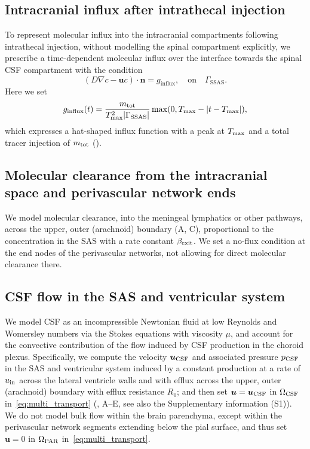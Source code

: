 \documentclass[fleqn,10pt]{wlscirep}
\begin{document}
\subsection*{Intracranial influx after intrathecal injection}
To represent molecular influx into the intracranial compartments
following intrathecal injection, without modelling the spinal
compartment explicitly, we prescribe a time-dependent molecular influx
over the interface towards the spinal CSF compartment with the condition
\begin{equation*}
  (D \nabla c - \bm u c ) \cdot \bm{n} = g_{\mathrm{influx}},  \quad \mathrm{on}  \quad \Gamma_{\mathrm{SSAS}}.
\end{equation*}
Here we set
\begin{equation*}
  g_\mathrm{influx}(t) = \frac{m_{\rm tot}}{T_{\rm max}^2 |\Gamma_{\rm SSAS}|} \max(0, T_{\rm max} - |t - T_{\rm max}|), 
\end{equation*}
which expresses a hat-shaped influx function with a peak at $T_{\rm max}$ and a total tracer injection of $m_{\rm tot}$ ().

\subsection*{Molecular clearance from the intracranial space and perivascular network ends}

We model molecular clearance, into the meningeal lymphatics or other
pathways, across the upper, outer (arachnoid) boundary
(A, C), proportional to the
concentration in the SAS with a rate constant $\beta_{\rm exit}$. We
set a no-flux condition at the end nodes of the perivascular networks,
not allowing for direct molecular clearance there.

\subsection*{CSF flow in the SAS and ventricular system}

We model CSF as an incompressible Newtonian fluid at low Reynolds and
Womersley numbers via the Stokes equations with viscosity $\mu$, and
account for the convective contribution of the flow induced by CSF
production in the choroid plexus. Specifically, we compute the
velocity $\bm u_{\rm CSF}$ and associated pressure $p_{\rm CSF}$ in
the SAS and ventricular system induced by a constant production at a
rate of $u_{\rm in}$ across the lateral ventricle walls and with
efflux across the upper, outer (arachnoid) boundary with efflux
resistance $R_0$; and then set $\bm u = \bm u_{\rm CSF}$ in
$\Omega_{\rm CSF}$ in~\eqref{eq:multi_transport}
(, A--E, see also
the Supplementary information (S1)). We do not model bulk flow within the brain
parenchyma, except within the perivascular network segments extending
below the pial surface, and thus set $\bm u = 0$ in $\Omega_{\rm PAR}$
in~\eqref{eq:multi_transport}.
\end{document}
